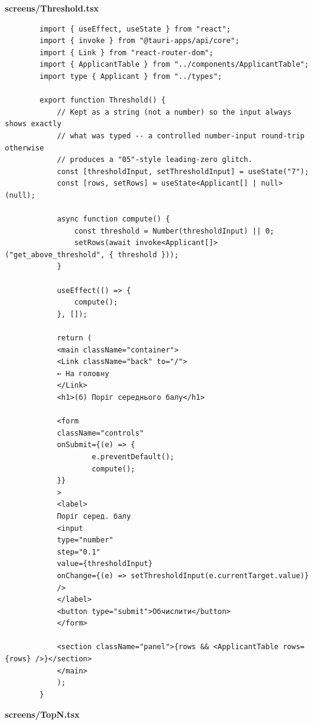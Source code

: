 \documentclass[14pt, a4paper]{extreport}
\begin{document}
	\textbf{screens/Threshold.tsx}

	\begin{verbatim}
		import { useEffect, useState } from "react";
		import { invoke } from "@tauri-apps/api/core";
		import { Link } from "react-router-dom";
		import { ApplicantTable } from "../components/ApplicantTable";
		import type { Applicant } from "../types";

		export function Threshold() {
			// Kept as a string (not a number) so the input always shows exactly
			// what was typed -- a controlled number-input round-trip otherwise
			// produces a "05"-style leading-zero glitch.
			const [thresholdInput, setThresholdInput] = useState("7");
			const [rows, setRows] = useState<Applicant[] | null>(null);

			async function compute() {
				const threshold = Number(thresholdInput) || 0;
				setRows(await invoke<Applicant[]>("get_above_threshold", { threshold }));
			}

			useEffect(() => {
				compute();
			}, []);

			return (
			<main className="container">
			<Link className="back" to="/">
			← На головну
			</Link>
			<h1>(б) Поріг середнього балу</h1>

			<form
			className="controls"
			onSubmit={(e) => {
					e.preventDefault();
					compute();
			}}
			>
			<label>
			Поріг серед. балу
			<input
			type="number"
			step="0.1"
			value={thresholdInput}
			onChange={(e) => setThresholdInput(e.currentTarget.value)}
			/>
			</label>
			<button type="submit">Обчислити</button>
			</form>

			<section className="panel">{rows && <ApplicantTable rows={rows} />}</section>
			</main>
			);
		}
	\end{verbatim}

	\textbf{screens/TopN.tsx}
\end{document}
